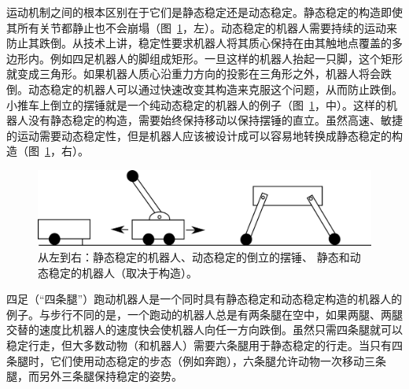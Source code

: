 运动机制之间的根本区别在于它们是静态稳定还是动态稳定。静态稳定的构造即使其所有关节都静止也不会崩塌（图~\ref{fig:stability}，左）。动态稳定的机器人需要持续的运动来防止其跌倒。从技术上讲，稳定性要求机器人将其质心保持在由其触地点覆盖的多边形内。例如四足机器人的脚组成矩形。一旦这样的机器人抬起一只脚，这个矩形就变成三角形。如果机器人质心沿重力方向的投影在三角形之外，机器人将会跌倒。动态稳定的机器人可以通过快速改变其构造来克服这个问题，从而防止跌倒。小推车上倒立的摆锤就是一个纯动态稳定的机器人的例子（图~\ref{fig:stability}，中）。这样的机器人没有静态稳定的构造，需要始终保持移动以保持摆锤的直立。虽然高速、敏捷的运动需要动态稳定性，但是机器人应该被设计成可以容易地转换成静态稳定的构造（图~\ref{fig:stability}，右）。

\begin{figure}
	\centering
		\includegraphics[width=\textwidth]{figs/stability.png}
	\caption{从左到右：静态稳定的机器人、动态稳定的倒立的摆锤、 静态和动态稳定的机器人（取决于构造）。}
	\label{fig:stability}
\end{figure}


四足（“四条腿”）跑动机器人是一个同时具有静态稳定和动态稳定构造的机器人的例子。与步行不同的是，一个跑动的机器人总是有两条腿在空中，如果两腿、两腿交替的速度比机器人的速度快会使机器人向任一方向跌倒。虽然只需四条腿就可以稳定行走，但大多数动物（和机器人）需要六条腿用于静态稳定的行走。当只有四条腿时，它们使用动态稳定的步态（例如奔跑），六条腿允许动物一次移动三条腿，而另外三条腿保持稳定的姿势。

